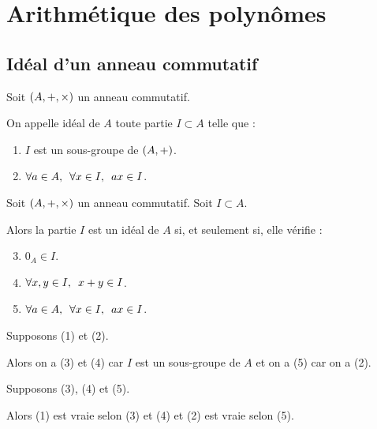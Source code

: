 \section{Arithmétique des polynômes}

\subsection{Idéal d'un anneau commutatif}

\begin{defi}
Soit \(\anneau{A}\) un anneau commutatif.

On appelle idéal de \(A\) toute partie \(I\subset A\) telle que :

\begin{enumerate}
\item \(I\) est un sous-groupe de \(\groupe{A}\). \\

\item \(\quantifs{\forall a\in A;\forall x\in I}ax\in I\). \\
\end{enumerate}
\end{defi}

\begin{prop}
Soit \(\anneau{A}\) un anneau commutatif. Soit \(I\subset A\).

Alors la partie \(I\) est un idéal de \(A\) si, et seulement si, elle vérifie :

\begin{enumerate}\setcounter{enumi}{2}
\item \(0_A\in I\). \\

\item \(\quantifs{\forall x,y\in I}x+y\in I\). \\

\item \(\quantifs{\forall a\in A;\forall x\in I}ax\in I\). \\
\end{enumerate}
\end{prop}

\begin{dem}
\impdir

Supposons (1) et (2).

Alors on a (3) et (4) car \(I\) est un sous-groupe de \(A\) et on a (5) car on a (2).

\imprec

Supposons (3), (4) et (5).

Alors (1) est vraie selon (3) et (4) et (2) est vraie selon (5).
\end{dem}

